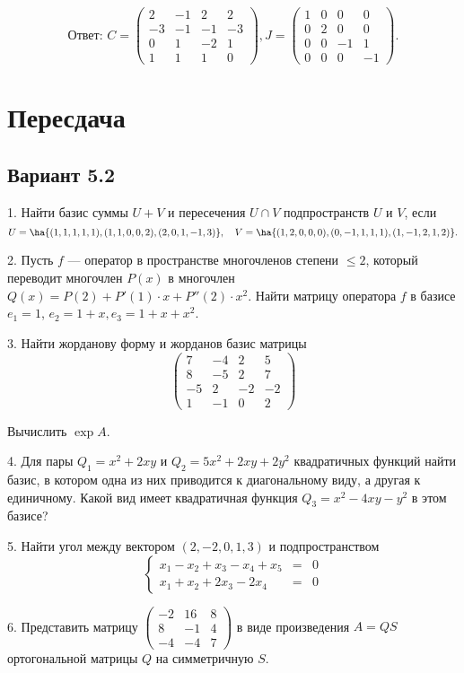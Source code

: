 \documentclass[a4paper]{article}
\begin{document}
$$
\textit{Ответ:\ } C=\left(
\begin{array}{rrrr}
2 & -1 & 2 & 2 \\
-3 & -1 & -1 & -3 \\
0 & 1 & -2 & 1 \\
1 & 1 & 1 & 0
\end{array}
\right), J=\left(
\begin{array}{rrrr}
1 & 0 & 0 & 0 \\
0 & 2 & 0 & 0 \\
0 & 0 & -1 & 1 \\
0 & 0 & 0 & -1
\end{array}
\right).
$$

\section{Пересдача}

\subsection{Вариант 5.2}

1. Найти базис суммы $U+V$ и пересечения $U\cap V$ подпространств
$U$ и $V$, если
$$U=\ha{(1, 1, 1, 1, 1),(1, 1, 0, 0, 2), (2, 0, 1, -1, 3)}, \quad V=\ha{(1, 2, 0, 0, 0), (0, -1, 1, 1, 1), (1, -1, 2, 1, 2)}.$$

2. Пусть $f$ --- оператор в пространстве многочленов степени $\leq
2$, который переводит многочлен $P(x)$ в многочлен
$Q(x)=P(2)+P'(1)\cdot x+P''(2)\cdot x^2$. Найти матрицу оператора
$f$ в базисе $e_1=1$, $e_2=1+x, e_3=1+x+x^2$.

3. Найти жорданову форму и жорданов базис матрицы
$$
\left(
\begin{array}{rrrr}
7 & -4 & 2 & 5 \\
8 & -5 & 2 & 7 \\
-5 & 2 & -2 & -2 \\
1 & -1 & 0 & 2
\end{array}
\right)
$$

Вычислить $\exp A$.

4. Для пары $Q_1=x^2+2xy$ и $Q_2=5x^2+2xy+2y^2$ квадратичных
функций найти базис, в котором одна из них приводится к
диагональному виду, а другая к единичному. Какой вид имеет
квадратичная функция $Q_3=x^2-4xy-y^2$ в этом базисе?

5. Найти угол между вектором $(2, -2, 0, 1, 3)$ и подпространством
$$
\left\{
\begin{array}{lll}
x_1-x_2+x_3-x_4+x_5&=&0\\
x_1+x_2+2x_3-2x_4&=&0
\end{array}\right.
$$

6. Представить матрицу $
\left(
\begin{array}{rrr}
-2 & 16 & 8 \\
8 & -1 & 4 \\
-4 & -4 & 7
\end{array}\right)$ в виде произведения $A=QS$ ортогональной
матрицы $Q$ на симметричную $S$.

\medskip
\dmvntrail
\end{document}
